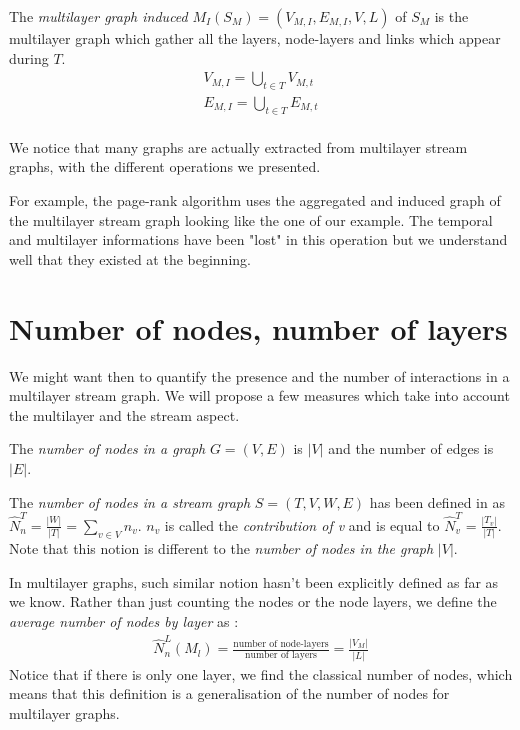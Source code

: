 \documentclass[dvipsnames,a4paper,11pt]{article}
\theoremstyle{definition}
\theoremstyle{remark}
\theoremstyle{remark}
\begin{document}
    
    The {\em multilayer graph induced} $M_I(S_M) = (V_{M,I}, E_{M,I}, V,L)$ of $S_M$ is the multilayer graph which gather all the layers, node-layers and links which appear during $T$.
    \begin{align*}
    	V_{M,I} = \bigcup_{t\in T} V_{M,t}\\
    	E_{M,I} = \bigcup_{t\in T} E_{M,t}\\
    \end{align*}
    
	
	We notice that many graphs are actually extracted from multilayer stream graphs, with the different operations we presented.	
	
	For example, the page-rank algorithm uses the aggregated and induced graph of the multilayer stream graph looking like the one of our example. The temporal and multilayer informations have been "lost" in this operation but we understand well that they existed at the beginning.
	
	
	\section{Number of nodes, number of layers}
	
	We might want then to quantify the presence and the number of interactions in a multilayer stream graph. We will propose a few measures which take into account the multilayer and the stream aspect.
	
	The {\em number of nodes in a graph} $G=(V,E)$ is $|V|$ and the number of edges is $|E|$.
	
	The {\em number of nodes in a stream graph} $S=(T,V,W,E)$ has been defined in \cite{stream} as $\hat{N}^T_n=\frac{|W|}{|T|}=\sum_{v\in V} n_v$. $n_v$ is called the {\em contribution of v} and is equal to $\hat{N}^T_v=\frac{|T_v|}{|T|}$. Note that this notion is different to the {\em number of nodes in the graph} $|V|$.
	\newline
	
	In multilayer graphs, such similar notion hasn't been explicitly defined as far as we know.
	Rather than just counting the nodes or the node layers, we define the {\em average number of nodes by layer} as :
	\begin{align*}
		\hat{N}_n^L(M_l) = \frac{\text{number of node-layers}}{\text{number of layers}}=\frac{|V_M|}{|L|}
	\end{align*}	    
	Notice that if there is only one layer, we find the classical number of nodes, which means that this definition is a generalisation of the number of nodes for multilayer graphs.
		
\end{document}
